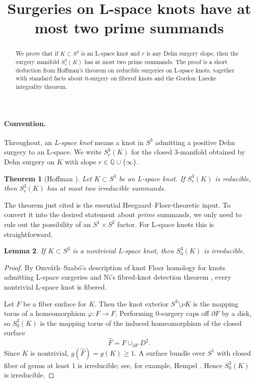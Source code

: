 \documentclass[11pt]{article}
\title{Surgeries on L-space knots have at most two prime summands}
\author{}
\date{}
\newtheorem{theorem}{Theorem}
\newtheorem{lemma}[theorem]{Lemma}
\newcommand{\Q}{\mathbb{Q}}
\begin{document}
\maketitle

\begin{abstract}
We prove that if $K\subset S^3$ is an L-space knot and $r$ is any Dehn surgery slope, then the surgery manifold $S^3_r(K)$ has at most two prime summands. The proof is a short deduction from Hoffman's theorem on reducible surgeries on L-space knots, together with standard facts about $0$-surgery on fibered knots and the Gordon--Luecke integrality theorem.
\end{abstract}

\paragraph{Convention.}
Throughout, an \emph{L-space knot} means a knot in $S^3$ admitting a positive Dehn surgery to an L-space. We write $S^3_r(K)$ for the closed $3$-manifold obtained by Dehn surgery on $K$ with slope $r\in \Q\cup\{\infty\}$.

\begin{theorem}[Hoffman {\cite{Hoffman}}]\label{thm:Hoffman}
Let $K\subset S^3$ be an L-space knot. If $S^3_r(K)$ is reducible, then $S^3_r(K)$ has at most two irreducible summands.
\end{theorem}

The theorem just cited is the essential Heegaard--Floer-theoretic input. To convert it into the desired statement about \emph{prime} summands, we only need to rule out the possibility of an $S^1\times S^2$ factor. For L-space knots this is straightforward.

\begin{lemma}\label{lem:zero-irred}
If $K\subset S^3$ is a nontrivial L-space knot, then $S^3_0(K)$ is irreducible.
\end{lemma}

\begin{proof}
By Ozsv\'ath--Szab\'o's description of knot Floer homology for knots admitting L-space surgeries \cite{OS} and Ni's fibred-knot detection theorem \cite{Ni}, every nontrivial L-space knot is fibered.

Let $F$ be a fiber surface for $K$. Then the knot exterior $S^3\setminus \nu K$ is the mapping torus of a homeomorphism $\varphi\colon F\to F$. Performing $0$-surgery caps off $\partial F$ by a disk, so $S^3_0(K)$ is the mapping torus of the induced homeomorphism of the closed surface
\[
\widehat F = F\cup_{\partial F} D^2.
\]
Since $K$ is nontrivial, $g(\widehat F)=g(K)\ge 1$. A surface bundle over $S^1$ with closed fiber of genus at least $1$ is irreducible; see, for example, Hempel \cite[Chapter~10]{Hempel}. Hence $S^3_0(K)$ is irreducible.
\end{proof}
\end{document}
